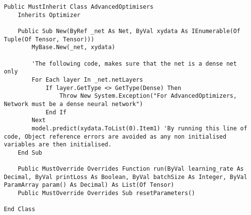 \begin{verbatim}
Public MustInherit Class AdvancedOptimisers
    Inherits Optimizer

    Public Sub New(ByRef _net As Net, ByVal xydata As IEnumerable(Of Tuple(Of Tensor, Tensor)))
        MyBase.New(_net, xydata)

        'The following code, makes sure that the net is a dense net only
        For Each layer In _net.netLayers
            If layer.GetType <> GetType(Dense) Then
                Throw New System.Exception("For AdvancedOptimizers, Network must be a dense neural network")
            End If
        Next
        model.predict(xydata.ToList(0).Item1) 'By running this line of code, Object reference errors are avoided as any non initialised variables are then initialised.
    End Sub

    Public MustOverride Overrides Function run(ByVal learning_rate As Decimal, ByVal printLoss As Boolean, ByVal batchSize As Integer, ByVal ParamArray param() As Decimal) As List(Of Tensor)
    Public MustOverride Overrides Sub resetParameters()

End Class
\end{verbatim}